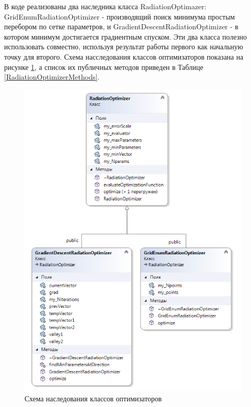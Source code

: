 В коде реализованы два наследника класса RadiationOptimazer: GridEnumRadiationOptimizer - производящий поиск минимума простым перебором по сетке параметров, и GradientDescentRadiationOptimizer - в котором минимум достигается градиентным спуском. Эти два класса полезно использовать совместно, используя результат работы первого как начальную точку для второго. Схема насследования классов оптимизаторов показана на рисунке \ref{radiationOptimizer}, а список их публичных методов приведен в Таблице \ref{RadiationOptimizerMethods}.
\begin{figure}
	\centering
	\includegraphics[width=10.5 cm]{./fig/radiationOptimizer.png} 
	\caption{Схема наследования классов оптимизаторов}
	\label{radiationOptimizer}
\end{figure}

